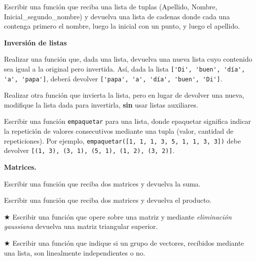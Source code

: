 \begin{ejercicio}
Escribir una función que reciba una lista de tuplas (Apellido,
Nombre, Inicial\_segundo\_nombre) y devuelva una lista de cadenas
donde cada una contenga primero el nombre, luego la inicial con un punto, y luego el
apellido.
\end{ejercicio}


\begin{ejercicio}{ \bf Inversión de listas}
\begin{partes}
\item Realizar una función que, dada una lista, devuelva una nueva lista cuyo
contenido sea igual a la original pero invertida. Así, dada la lista
\lstinline!['Di', 'buen', 'día', 'a', 'papa']!, deberá devolver
\lstinline!['papa', 'a', 'día', 'buen', 'Di']!.

\item Realizar otra función que invierta la lista, pero en lugar de devolver
una nueva, modifique la lista dada para invertirla, {\bf sin}  usar listas
auxiliares.
\end{partes}
\end{ejercicio}


\begin{ejercicio}
Escribir una función \texttt{empaquetar} para una lista, donde
epaquetar significa indicar la repetición de valores consecutivos
mediante una tupla (valor, cantidad de repeticiones). Por ejemplo,
\lstinline!empaquetar([1, 1, 1, 3, 5, 1, 1, 3, 3])! debe devolver
\lstinline![(1, 3), (3, 1), (5, 1), (1, 2), (3, 2)]!.
\end{ejercicio}


\begin{ejercicio}
{\bf Matrices.}
\begin{partes}
\item Escribir una función que reciba dos matrices y devuelva la suma.
\item Escribir una función que reciba dos matrices y devuelva el producto.
\item $\bigstar$ Escribir una función que opere sobre una matriz y mediante {\it
eliminación gaussiana} devuelva una matriz triangular superior.
\item $\bigstar$ Escribir una función que indique si un grupo de vectores, recibidos
mediante una lista, son linealmente independientes o no.
\end{partes}
\end{ejercicio}


